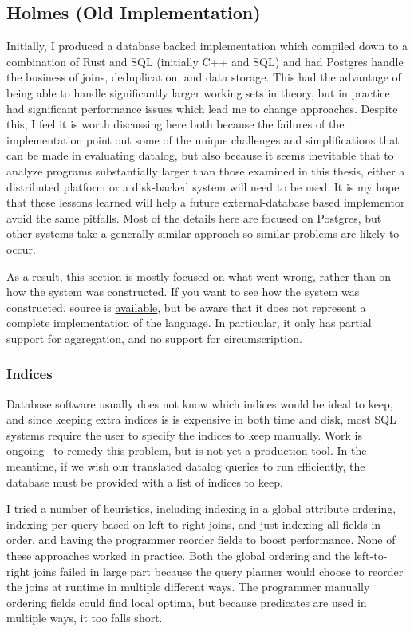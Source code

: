 \subsection{Holmes (Old Implementation)}
Initially, I produced a database backed implementation which compiled down to a combination of Rust and SQL (initially C++ and SQL) and had Postgres handle the business of joins, deduplication, and data storage.
This had the advantage of being able to handle significantly larger working sets in theory, but in practice had significant performance issues which lead me to change approaches.
Despite this, I feel it is worth discussing here both because the failures of the implementation point out some of the unique challenges and simplifications that can be made in evaluating datalog, but also because it seems inevitable that to analyze programs substantially larger than those examined in this thesis, either a distributed platform or a disk-backed system will need to be used.
It is my hope that these lessons learned will help a future external-database based implementor avoid the same pitfalls.
Most of the details here are focused on Postgres, but other systems take a generally similar approach so similar problems are likely to occur.

As a result, this section is mostly focused on what went wrong, rather than on how the system was constructed.
If you want to see how the system was constructed, source is 
\href{https://github.com/maurer/holmes}{available},
but be aware that it does not represent a complete implementation of the language.
In particular, it only has partial support for aggregation, and no support for circumscription.

\subsubsection{Indices}
Database software usually does not know which indices would be ideal to keep, and since keeping extra indices is is expensive in both time and disk, most SQL systems require the user to specify the indices to keep manually.
Work is ongoing~\cite{peloton} to remedy this problem, but is not yet a production tool.
In the meantime, if we wish our translated datalog queries to run efficiently, the database must be provided with a list of indices to keep.

I tried a number of heuristics, including indexing in a global attribute ordering, indexing per query based on left-to-right joins, and just indexing all fields in order, and having the programmer reorder fields to boost performance.
None of these approaches worked in practice.
Both the global ordering and the left-to-right joins failed in large part because the query planner would choose to reorder the joins at runtime in multiple different ways.
The programmer manually ordering fields could find local optima, but because predicates are used in multiple ways, it too falls short.

